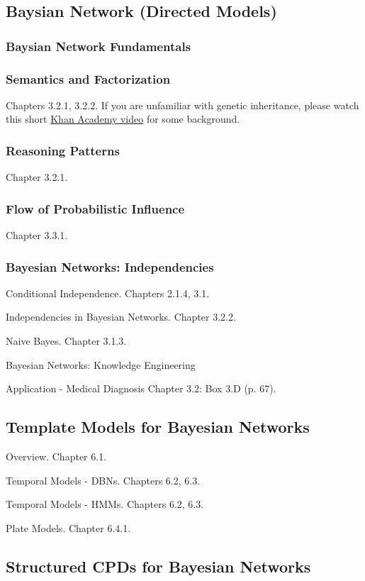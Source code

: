 \documentclass[12pt]{article}
\numberwithin{equation}{section}
\begin{document}
\subsection{Baysian Network (Directed Models)}
\subsubsection{Baysian Network Fundamentals}
\subsubsection{Semantics and Factorization}
Chapters 3.2.1, 3.2.2. If you are unfamiliar with genetic inheritance, please watch this short \href{https://www.khanacademy.org/science/biology/classical-genetics/mendelian--genetics/v/introduction-to-heredity}{Khan Academy video} for some background.
\subsubsection{Reasoning Patterns}
Chapter 3.2.1.
\subsubsection{Flow of Probabilistic Influence}
Chapter 3.3.1.
\subsubsection{Bayesian Networks: Independencies}

Conditional Independence. Chapters 2.1.4, 3.1.

Independencies in Bayesian Networks. Chapter 3.2.2.

Naive Bayes. Chapter 3.1.3.

Bayesian Networks: Knowledge Engineering

Application - Medical Diagnosis Chapter 3.2: Box 3.D (p. 67).

\subsection{Template Models for Bayesian Networks}

Overview. Chapter 6.1.

Temporal Models - DBNs. Chapters 6.2, 6.3.

Temporal Models - HMMs. Chapters 6.2, 6.3.

Plate Models. Chapter 6.4.1.

\subsection{Structured CPDs for Bayesian Networks}
\end{document}

